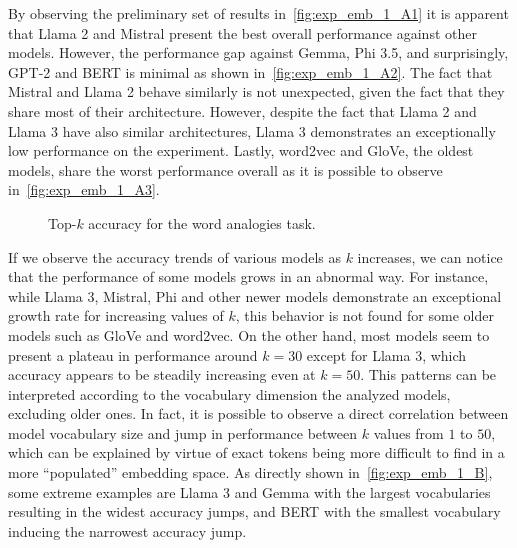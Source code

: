 By observing the preliminary set of results in~\cref{fig:exp_emb_1_A1} it is apparent that Llama 2 and Mistral present the best overall performance against other models.
However, the performance gap against Gemma, Phi 3.5, and surprisingly, GPT-2 and BERT is minimal as shown in~\cref{fig:exp_emb_1_A2}.
The fact that Mistral and Llama 2 behave similarly is not unexpected, given the fact that they share most of their architecture.
However, despite the fact that Llama 2 and Llama 3 have also similar architectures, Llama 3 demonstrates an exceptionally low performance on the experiment.
Lastly, word2vec and GloVe, the oldest models, share the worst performance overall as it is possible to observe in~\cref{fig:exp_emb_1_A3}.

\begin{figure}[t!]
    \centering
    \quad
    \caption{Top-$k$ accuracy for the word analogies task.}
    \label{fig:exp_emb_1_A}
\end{figure}

If we observe the accuracy trends of various models as $k$ increases, we can notice that the performance of some models grows in an abnormal way.
For instance, while Llama 3, Mistral, Phi and other newer models demonstrate an exceptional growth rate for increasing values of $k$, this behavior is not found for some older models such as GloVe and word2vec.
On the other hand, most models seem to present a plateau in performance around $k = 30$ except for Llama 3, which accuracy appears to be steadily increasing even at $k = 50$.
This patterns can be interpreted according to the vocabulary dimension the analyzed models, excluding older ones.
In fact, it is possible to observe a direct correlation between model vocabulary size and jump in performance between $k$ values from $1$ to $50$, which can be explained by virtue of exact tokens being more difficult to find in a more ``populated'' embedding space.
As directly shown in~\cref{fig:exp_emb_1_B}, some extreme examples are Llama 3 and Gemma with the largest vocabularies resulting in the widest accuracy jumps, and BERT with the smallest vocabulary inducing the narrowest accuracy jump.

